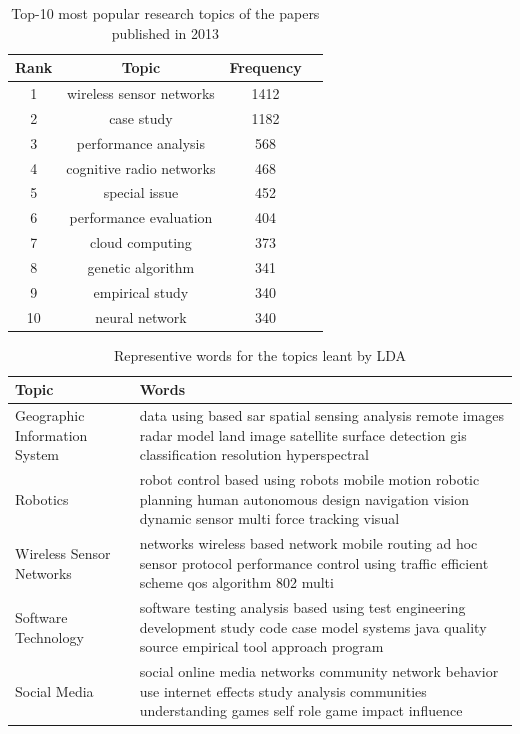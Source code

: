 \documentclass{sig-alternate-05-2015}
\begin{document}
\begin{table}
\centering
\caption{Top-10 most popular research topics of the papers published in 2013} \label{tbl:app1}
\begin{tabular}{|c|c|c||c|} \hline
Rank & Topic & Frequency\\ \hline
1 & wireless sensor networks & 1412 \\ \hline
2 & case study & 1182 \\ \hline
3 & performance analysis & 568 \\ \hline
4 & cognitive radio networks & 468 \\ \hline
5 & special issue & 452 \\ \hline
6 & performance evaluation & 404 \\ \hline
7 & cloud computing & 373 \\ \hline
8 & genetic algorithm & 341 \\ \hline
9 & empirical study & 340 \\ \hline
10 & neural network & 340 \\ \hline
\end{tabular}
\end{table}

\begin{table}\small
\centering
\caption{Representive words for the topics leant by LDA} \label{tbl:topics}
\begin{tabular}{|p{65pt}|p{180pt}|} \hline
Topic & Words\\ \hline
Geographic Information System & data using based sar spatial sensing analysis remote images radar model land image satellite surface detection gis classification resolution hyperspectral \\ \hline
Robotics & robot control based using robots mobile motion robotic planning human autonomous design navigation vision dynamic sensor multi force tracking visual \\ \hline
Wireless Sensor Networks & networks wireless based network mobile routing ad hoc sensor protocol performance control using traffic efficient scheme qos algorithm 802 multi \\ \hline
Software Technology & software testing analysis based using test engineering development study code case model systems java quality source empirical tool approach program \\ \hline
Social Media & social online media networks community network behavior use internet effects study analysis communities understanding games self role game impact influence \\ \hline
\end{tabular}
\end{table}
\end{document}
